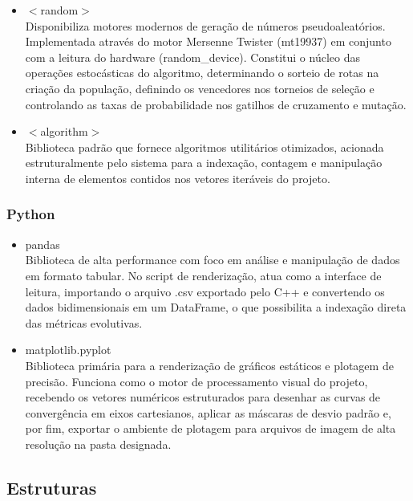 \documentclass[conference]{IEEEtran}
\begin{document}
\begin{itemize}
	\item $<$random$>$ \\
	Disponibiliza motores modernos de geração de números pseudoaleatórios. Implementada através do motor Mersenne Twister (mt19937) em conjunto com a leitura do hardware (random\_device). Constitui o núcleo das operações estocásticas do algoritmo, determinando o sorteio de rotas na criação da população, definindo os vencedores nos torneios de seleção e controlando as taxas de probabilidade nos gatilhos de cruzamento e mutação.
	
	\item $<$algorithm$>$ \\
	Biblioteca padrão que fornece algoritmos utilitários otimizados, acionada estruturalmente pelo sistema para a indexação, contagem e manipulação interna de elementos contidos nos vetores iteráveis do projeto.
\end{itemize}

\subsubsection{Python}

\begin{itemize}
	\item pandas \\
	Biblioteca de alta performance com foco em análise e manipulação de dados em formato tabular. No script de renderização, atua como a interface de leitura, importando o arquivo .csv exportado pelo C++ e convertendo os dados bidimensionais em um DataFrame, o que possibilita a indexação direta das métricas evolutivas.
	
	\item matplotlib.pyplot \\
	Biblioteca primária para a renderização de gráficos estáticos e plotagem de precisão. Funciona como o motor de processamento visual do projeto, recebendo os vetores numéricos estruturados para desenhar as curvas de convergência em eixos cartesianos, aplicar as máscaras de desvio padrão e, por fim, exportar o ambiente de plotagem para arquivos de imagem de alta resolução na pasta designada.
\end{itemize}


\subsection{Estruturas}
\end{document}
